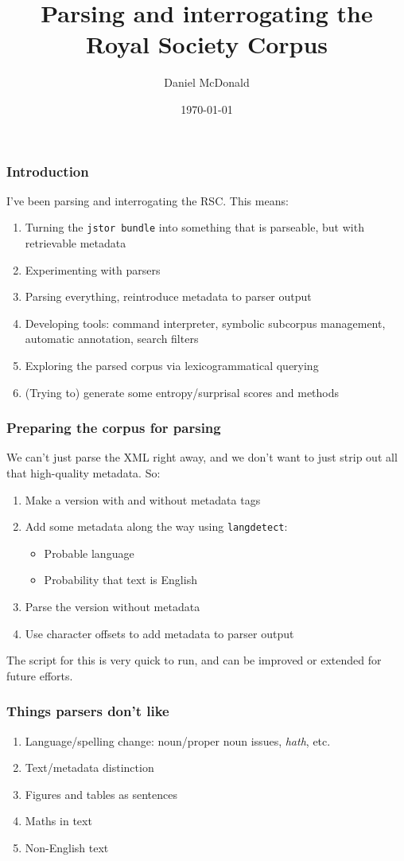 \documentclass{beamer}       %
\title[MOOD-Z, UZH]{Parsing and interrogating the Royal Society Corpus}
\author[Daniel McDonald]{Daniel McDonald}
\date{\today}
\begin{document}
\frame{\titlepage}

\begin{frame}
\frametitle{Introduction}

I've been parsing and interrogating the RSC. This means:

\begin{enumerate}
    \item Turning the \texttt{jstor bundle} into something that is parseable, but with retrievable metadata
    \item Experimenting with parsers
    \item Parsing everything, reintroduce metadata to parser output
    \item Developing tools: command interpreter, symbolic subcorpus management, automatic annotation, search filters
    \item Exploring the parsed corpus via lexicogrammatical querying
    \item (Trying to) generate some entropy\slash surprisal scores and methods
\end{enumerate}
\end{frame}

\begin{frame}
\frametitle{Preparing the corpus for parsing}

We can't just parse the XML right away, and we don't want to just strip out all that high-quality metadata. So:

\begin{enumerate}
    \item Make a version with and without metadata tags
    \item Add some metadata along the way using \texttt{langdetect}:
    \begin{itemize}
        \item Probable language
        \item Probability that text is English
    \end{itemize}
    \item Parse the version without metadata
    \item Use character offsets to add metadata to parser output
\end{enumerate}
The script for this is very quick to run, and can be improved or extended for future efforts.
\end{frame}

\begin{frame}
\frametitle{Things parsers don't like}

\begin{enumerate}
    \item Language\slash spelling change: noun\slash proper noun issues, \emph{hath}, etc.
    \item Text\slash metadata distinction
    \item Figures and tables as sentences
    \item Maths in text
    \item Non-English text
\end{enumerate}
\end{frame}
\end{document}
